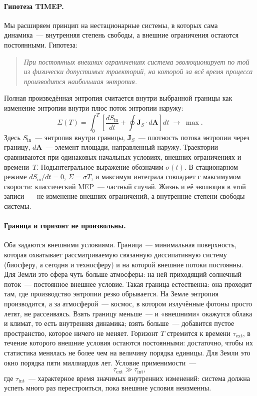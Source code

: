\documentclass[11pt,a4paper]{article}
\begin{document}
\paragraph{Гипотеза TIMEP.}
Мы расширяем принцип на нестационарные системы, в которых сама динамика~--- внутренняя степень свободы, а внешние ограничения остаются постоянными. Гипотеза:

\begin{quote}
\emph{При постоянных внешних ограничениях система эволюционирует по той из физически допустимых траекторий, на которой за всё время процесса производится наибольшая энтропия.}
\end{quote}

Полная произведённая энтропия считается внутри выбранной границы как изменение энтропии внутри плюс поток энтропии наружу:
\begin{equation}\label{eq:timep}
\Sigma(T)=\int_0^T\left[\frac{dS_{\mathrm{in}}}{dt}+\oint \mathbf{J}_S\cdot d\mathbf{A}\right]dt\;\to\;\max .
\end{equation}
Здесь $S_{\mathrm{in}}$~--- энтропия внутри границы, $\mathbf{J}_S$~--- плотность потока энтропии через границу, $d\mathbf{A}$~--- элемент площади, направленный наружу. Траектории сравниваются при одинаковых начальных условиях, внешних ограничениях и времени~$T$. Подынтегральное выражение обозначим $\sigma(t)$. В стационарном режиме $dS_{\mathrm{in}}/dt=0$, $\Sigma=\sigma T$, и максимум интеграла совпадает с максимумом скорости: классический MEP~--- частный случай. Жизнь и её эволюция в этой записи~--- не изменение внешних ограничений, а внутренние степени свободы системы.

\paragraph{Граница и горизонт не произвольны.}
Оба задаются внешними условиями. Граница~--- минимальная поверхность, которая охватывает рассматриваемую связанную диссипативную систему (биосферу, а сегодня и техносферу) и на которой внешние потоки постоянны. Для Земли это сфера чуть больше атмосферы: на ней приходящий солнечный поток~--- постоянное внешнее условие. Такая граница естественна: она проходит там, где производство энтропии резко обрывается. На Земле энтропия производится, а за атмосферой~--- космос, в котором излучённые фотоны просто летят, не рассеиваясь. Взять границу меньше~--- и «внешними» окажутся облака и климат, то есть внутренняя динамика; взять больше~--- добавится пустое пространство, которое ничего не меняет. Горизонт $T$ стремится к времени $\tau_{\mathrm{ext}}$, в течение которого внешние условия остаются постоянными: достаточно, чтобы их статистика менялась не более чем на величину порядка единицы. Для Земли это окно порядка пяти миллиардов лет. Условие применимости~---
\begin{equation}
\tau_{\mathrm{ext}}\gg\tau_{\mathrm{int}},
\end{equation}
где $\tau_{\mathrm{int}}$~--- характерное время значимых внутренних изменений: система должна успеть много раз перестроиться, пока внешние условия неизменны.
\end{document}
